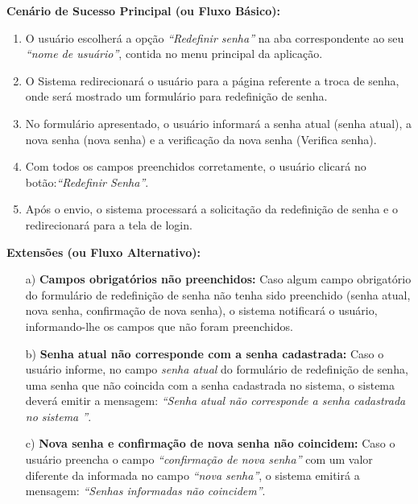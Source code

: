 \begin{quadro}[H]
\begin{framed}
\begin{flushleft}
		\textbf{Cenário de Sucesso Principal (ou Fluxo Básico):}\\
			\begin{enumerate}
			 	\item{O usuário escolherá a opção \textit{``Redefinir senha''} na aba correspondente ao seu \textit{``nome de usuário''}, contida no menu principal da aplicação.}
			 	\item{O Sistema redirecionará o usuário para a página referente a troca de senha, onde será mostrado um formulário para redefinição de senha.}
			 	\item{No formulário apresentado, o usuário informará a senha atual (senha atual), a nova senha (nova senha) e a verificação da nova senha (Verifica senha).}
			 	\item{Com todos os campos preenchidos corretamente, o usuário clicará no botão:\textit{``Redefinir Senha''}.}
			 	\item{Após o envio, o sistema processará a solicitação da redefinição de senha e o redirecionará para a tela de login.}
			 \end{enumerate}

		\textbf{Extensões (ou Fluxo Alternativo):}
		\begin{itemize}
			\item[a)] \textbf{Campos obrigatórios não preenchidos:} Caso algum campo obrigatório do formulário de redefinição de senha não tenha sido preenchido (senha atual, nova senha, confirmação de nova senha), o sistema notificará o usuário, informando-lhe os campos que não foram preenchidos.
			\item[b)] \textbf{Senha atual não corresponde com a senha cadastrada:} Caso o usuário informe, no campo \textit{senha atual} do formulário de redefinição de senha, uma senha que não coincida com a senha cadastrada no sistema, o sistema deverá emitir a mensagem: \textit{``Senha atual não corresponde a senha cadastrada no sistema ''}.
			\item[c)] \textbf{Nova senha e confirmação de nova senha não coincidem:} Caso o usuário preencha o campo \textit{``confirmação de nova senha''} com um valor diferente da informada no campo \textit{``nova senha''}, o sistema emitirá a mensagem: \textit{``Senhas informadas não coincidem''}.
		\end{itemize}


		\end{flushleft}

	\end{framed}

\end {quadro} %

